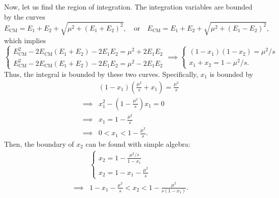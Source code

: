 \documentclass[11pt]{article}
\theoremstyle{definition}
\begin{document}
Now, let us find the region of integration. The integration variables are bounded by the curves
\begin{equation}
    E_\text{CM} = E_1 + E_2 + \sqrt{\mu^2 + (E_1+E_2)^2}, \quad \text{or} \quad E_\text{CM} = E_1 + E_2 + \sqrt{\mu^2 + (E_1-E_2)^2},
\end{equation}
which implies
\begin{equation}
    \begin{cases}
        E_\text{CM}^2 - 2E_\text{CM}(E_1+E_2)-2E_1E_2 = \mu^2 + 2E_1E_2\\
        E_\text{CM}^2 - 2E_\text{CM}(E_1+E_2)-2E_1E_2 = \mu^2  -2E_1E_2
    \end{cases} 
    \implies
    \begin{cases}
        (1-x_1)(1-x_2) =\mu^2/s\\
        x_1+x_2 = 1-\mu^2/s.
    \end{cases}
\end{equation}
Thus, the integral is bounded by these two curves. Specifically, $x_1$ is bounded by
\begin{equation}
\begin{aligned}
    &(1-x_1)(\frac{\mu^2}{s}+x_1) = \frac{\mu^2}{s} \\
    \implies & x_1^2-\left(1-\frac{\mu^2}{s}\right)x_1 = 0 \\
    \implies & x_1 = 1-\frac{\mu^2}{s}\\
    \implies &0<x_1 < 1 - \frac{\mu^2}{s}.
\end{aligned}
\end{equation}
Then, the boundary of $x_2$ can be found with simple algebra:
\begin{equation}
    \begin{aligned}
        &\begin{cases}
        x_2 = 1-\frac{\mu^2/s}{1-x_1}\\
        x_2 = 1-x_1-\frac{\mu^2}{s}
    \end{cases} \\
        \implies & 
        1-x_1-\frac{\mu^2}{s} < x_2 <1-\frac{\mu^2}{s(1-x_1)}.
    \end{aligned}
\end{equation}
\end{document}
